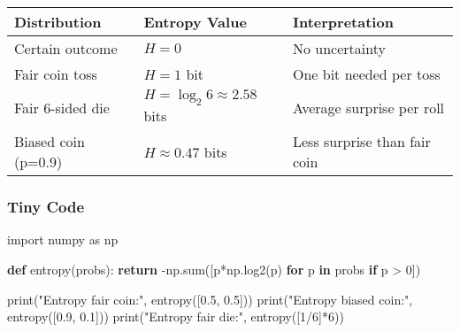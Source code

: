 \documentclass[
  letterpaper,
  DIV=11,
  numbers=noendperiod]{scrreprt}
\newenvironment{Shaded}{\begin{snugshade}}{\end{snugshade}}
\newcommand{\BuiltInTok}[1]{\textcolor[rgb]{0.00,0.23,0.31}{#1}}
\newcommand{\ControlFlowTok}[1]{\textcolor[rgb]{0.00,0.23,0.31}{\textbf{#1}}}
\newcommand{\DecValTok}[1]{\textcolor[rgb]{0.68,0.00,0.00}{#1}}
\newcommand{\FloatTok}[1]{\textcolor[rgb]{0.68,0.00,0.00}{#1}}
\newcommand{\ImportTok}[1]{\textcolor[rgb]{0.00,0.46,0.62}{#1}}
\newcommand{\KeywordTok}[1]{\textcolor[rgb]{0.00,0.23,0.31}{\textbf{#1}}}
\newcommand{\NormalTok}[1]{\textcolor[rgb]{0.00,0.23,0.31}{#1}}
\newcommand{\OperatorTok}[1]{\textcolor[rgb]{0.37,0.37,0.37}{#1}}
\newcommand{\StringTok}[1]{\textcolor[rgb]{0.13,0.47,0.30}{#1}}
\begin{document}
\begin{longtable}[]{@{}
  >{\raggedright\arraybackslash}p{}
  >{\raggedright\arraybackslash}p{}
  >{\raggedright\arraybackslash}p{}@{}}
\toprule\noalign{}
\begin{minipage}[b]{\linewidth}\raggedright
Distribution
\end{minipage} & \begin{minipage}[b]{\linewidth}\raggedright
Entropy Value
\end{minipage} & \begin{minipage}[b]{\linewidth}\raggedright
Interpretation
\end{minipage} \\
\midrule\noalign{}
\endhead
\bottomrule\noalign{}
\endlastfoot
Certain outcome & \(H=0\) & No uncertainty \\
Fair coin toss & \(H=1\) bit & One bit needed per toss \\
Fair 6-sided die & \(H=\log_2 6 \approx 2.58\) bits & Average surprise
per roll \\
Biased coin (p=0.9) & \(H \approx 0.47\) bits & Less surprise than fair
coin \\
\end{longtable}

\subsubsection{Tiny Code}\label{tiny-code-160}

\begin{Shaded}
\begin{Highlighting}[]
\ImportTok{import}\NormalTok{ numpy }\ImportTok{as}\NormalTok{ np}

\KeywordTok{def}\NormalTok{ entropy(probs):}
    \ControlFlowTok{return} \OperatorTok{{-}}\NormalTok{np.}\BuiltInTok{sum}\NormalTok{([p}\OperatorTok{*}\NormalTok{np.log2(p) }\ControlFlowTok{for}\NormalTok{ p }\KeywordTok{in}\NormalTok{ probs }\ControlFlowTok{if}\NormalTok{ p }\OperatorTok{\textgreater{}} \DecValTok{0}\NormalTok{])}

\BuiltInTok{print}\NormalTok{(}\StringTok{"Entropy fair coin:"}\NormalTok{, entropy([}\FloatTok{0.5}\NormalTok{, }\FloatTok{0.5}\NormalTok{]))}
\BuiltInTok{print}\NormalTok{(}\StringTok{"Entropy biased coin:"}\NormalTok{, entropy([}\FloatTok{0.9}\NormalTok{, }\FloatTok{0.1}\NormalTok{]))}
\BuiltInTok{print}\NormalTok{(}\StringTok{"Entropy fair die:"}\NormalTok{, entropy([}\DecValTok{1}\OperatorTok{/}\DecValTok{6}\NormalTok{]}\OperatorTok{*}\DecValTok{6}\NormalTok{))}
\end{Highlighting}
\end{Shaded}
\end{document}
